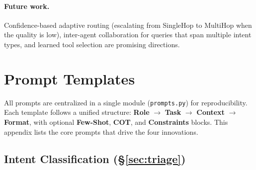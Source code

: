 \documentclass[11pt,a4paper]{article}
\begin{document}
\paragraph{Future work.}
Confidence-based adaptive routing (escalating from SingleHop to MultiHop when the quality is low), inter-agent collaboration for queries that span multiple intent types, and learned tool selection are promising directions.


\clearpage


\appendix

\section{Prompt Templates}
\label{app:prompts}

All prompts are centralized in a single module (\texttt{prompts.py}) for reproducibility.
Each template follows a unified structure: \textbf{Role} $\to$ \textbf{Task} $\to$ \textbf{Context} $\to$ \textbf{Format}, with optional \textbf{Few-Shot}, \textbf{COT}, and \textbf{Constraints} blocks.
This appendix lists the core prompts that drive the four innovations.

\subsection{Intent Classification (\S\ref{sec:triage})}
\label{app:prompt_classify}
\end{document}

